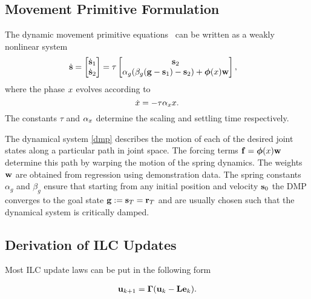 \subsection{Movement Primitive Formulation}
The dynamic movement primitive equations~\cite{Kober08} can be written as a weakly nonlinear system 
%
\begin{equation}
\begin{aligned}
\dot{\boldsymbol{\mathrm{s}}} &= \begin{bmatrix}
   \dot{\boldsymbol{\mathrm{s}}}_1 \\
   \dot{\boldsymbol{\mathrm{s}}}_2
 \end{bmatrix} = \tau \begin{bmatrix}
     \boldsymbol{\mathrm{s}}_2  \\
     \alpha_{g} (\beta_{g}(\boldsymbol{\mathrm{g}} - \boldsymbol{\mathrm{s}}_1) - \boldsymbol{\mathrm{s}}_2) +  \boldsymbol{\mathrm{\phi}}(x)\boldsymbol{\mathrm{w}}
  \end{bmatrix}
\label{dmp},
\end{aligned}
\end{equation}
%
\noindent where the phase $x$ evolves according to
%
\begin{equation}
\dot{x} = -\tau\alpha_{x}x.
\label{phase}
\end{equation}
%
\noindent The constants $\tau$ and $\alpha_{x}$ determine the scaling and settling time respectively. 

The dynamical system \eqref{dmp} describes the motion of each of the desired joint states along a particular path in joint space. The forcing terms $\boldsymbol{\mathrm{f}} = \boldsymbol{\mathrm{\phi}}(x)\boldsymbol{\mathrm{w}}$ determine this path by warping the motion of the spring dynamics. The weights $\boldsymbol{\mathrm{w}}$ are obtained from regression using demonstration data. The spring constants $\alpha_{g}$ and $\beta_{g}$ ensure that starting from any initial position and velocity $\boldsymbol{\mathrm{s}}_0$ the DMP converges to the goal state $\boldsymbol{\mathrm{g}} := \boldsymbol{\mathrm{s}}_T = \boldsymbol{\mathrm{r}}_T$ and are usually chosen such that the dynamical system is critically damped.



\subsection{Derivation of ILC Updates}

Most ILC update laws can be put in the following form

\begin{equation}
\begin{aligned}
\boldsymbol{\mathrm{u}}_{k+1} = \boldsymbol{\mathrm{\Gamma}}(\boldsymbol{\mathrm{u}}_{k} - \boldsymbol{\mathrm{L}}\boldsymbol{\mathrm{e}}_{k}).
\end{aligned}
\label{ILCupdateForm}
\end{equation}

